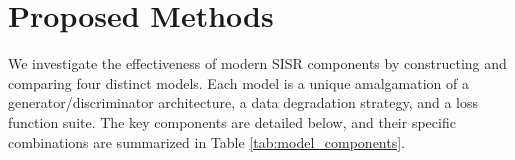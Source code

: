 \documentclass[10pt,twocolumn,letterpaper]{article}
\begin{document}
\begin{table}[t!]
\centering
\caption{\textbf{Comparison of Architectural and Training Components Across the Four Proposed Models.} Each model represents a unique combination of a generator backbone, a training data generation strategy (degradation pipeline), and a loss function suite.}
\label{tab:model_components}
\end{table}

\section{Proposed Methods}
\label{sec:methods}
We investigate the effectiveness of modern SISR components by constructing and comparing four distinct models. Each model is a unique amalgamation of a generator/discriminator architecture, a data degradation strategy, and a loss function suite. The key components are detailed below, and their specific combinations are summarized in Table \ref{tab:model_components}.
\end{document}
